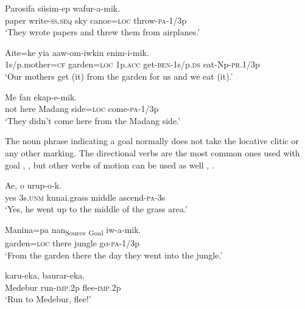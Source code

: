 \ea%
\label{ex:4:x858}
\gll Parosifa  siisim-ep     wafur-a-mik. \\
   paper  write-\textsc{ss}.\textsc{seq}  sky  canoe=\textsc{loc}  throw-\textsc{pa}-1/3p   \\
\glt`They wrote papers and threw them from airplanes.'
\z

\ea%
\label{ex:4:x859}
\gll Aite=ke    yia  aaw-om-iwkin  enim-i-mik. \\
   1s/p.mother=\textsc{cf}  garden=\textsc{loc}  1p.\textsc{acc}  get-\textsc{ben}-1s/p.\textsc{ds}  eat-Np-\textsc{pr}.1/3p   \\
\glt`Our mothers get (it) from the garden for us and we eat (it).'
\z

\ea%
\label{ex:4:x864}
\gll Me  fan     ekap-e-mik. \\
   not  here  Madang  side=\textsc{loc}  come-\textsc{pa}-1/3p   \\
\glt`They didn't come here from the Madang side.'
\z

The noun phrase indicating a goal normally does not take the locative clitic or any other marking.  The directional verbs are the most common ones used with goal , , but other verbs of motion can be used as well , . 

\ea%
\label{ex:4:x860}
\gll Ae,  o     urup-o-k. \\
    yes  3s.\textsc{unm}  kunai.grass  middle  ascend-\textsc{pa}-3s  \\
\glt`Yes, he went up to the middle of the  grass area.'
\z

\ea%
\label{ex:4:x861}
\gll {\ob}Manina=pa  nan{\cb}\textsubscript{Source}  {\ob}\textsubscript{Goal}  iw-a-mik. \\
    garden=\textsc{loc}  there  jungle  go-\textsc{pa}-1/3p  \\
\glt`From the garden there the day they went into the jungle.'
\z

\ea%
\label{ex:4:x862}
\gll {}  karu-eka,  baurar-eka. \\
   Medebur  run-\textsc{imp}.2p  flee-\textsc{imp}.2p   \\
\glt`Run to Medebur, flee!'
\z

